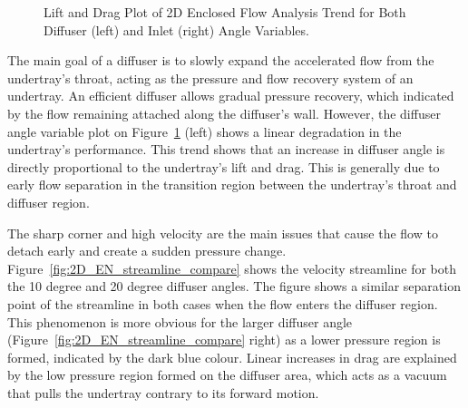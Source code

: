 \begin{figure}[!ht]
  \noindent
  \caption{Lift and Drag Plot of 2D Enclosed Flow Analysis Trend for Both Diffuser (left) and Inlet (right) Angle Variables.}
  \label{fig:2D_EN_result}
\end{figure}

\noindent The main goal of a diffuser is to slowly expand the accelerated flow from the undertray's throat, acting as the pressure and flow recovery system of an undertray. An efficient diffuser allows gradual pressure recovery, which indicated by the flow remaining attached along the diffuser's wall. However, the diffuser angle variable plot on Figure~\ref{fig:2D_EN_result} (left) shows a linear degradation in the undertray's performance. This trend shows that an increase in diffuser angle is directly proportional to the undertray's lift and drag. This is generally due to early flow separation in the transition region between the undertray's throat and diffuser region. 

\noindent The sharp corner and high velocity are the main issues that cause the flow to detach early and create a sudden pressure change. Figure~\ref{fig:2D_EN_streamline_compare} shows the velocity streamline for both the 10 degree and 20 degree diffuser angles. The figure shows a similar separation point of the streamline in both cases when the flow enters the diffuser region. This phenomenon is more obvious for the larger diffuser angle (Figure~\ref{fig:2D_EN_streamline_compare} right) as a lower pressure region is formed, indicated by the dark blue colour. Linear increases in drag are explained by the low pressure region formed on the diffuser area, which acts as a vacuum that pulls the undertray contrary to its forward motion.  

